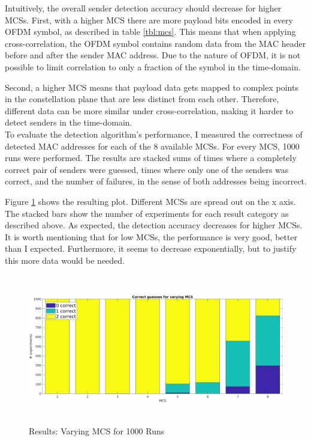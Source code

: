 Intuitively, the overall sender detection accuracy should decrease for higher \glspl{MCS}. First, with a higher \gls{MCS} there are more payload bits encoded in every \gls{OFDM} symbol, as described in table \ref{tbl:mcs}. This means that when applying cross-correlation, the \gls{OFDM} symbol contains random data from the \gls{MAC} header before and after the sender \gls{MAC} address. Due to the nature of \gls{OFDM}, it is not possible to limit correlation to only a fraction of the symbol in the time-domain.

Second, a higher \gls{MCS} means that payload data gets mapped to complex points in the constellation plane that are less distinct from each other. Therefore, different data can be more similar under cross-correlation, making it harder to detect senders in the time-domain.\\

To evaluate the detection algorithm's performance, I measured the correctness of detected \gls{MAC} addresses for each of the 8 available \glspl{MCS}. For every \gls{MCS}, 1000 runs were performed. The results are stacked sums of times where a completely correct pair of senders were guessed, times where only one of the senders was correct, and the number of failures, in the sense of both addresses being incorrect.

Figure \ref{fig:vary_mcs} shows the resulting plot. Different \glspl{MCS} are spread out on the x axis. The stacked bars show the number of experiments for each result category as described above. As expected, the detection accuracy decreases for higher \glspl{MCS}. It is worth mentioning that for low \glspl{MCS}, the performance is very good, better than I expected. Furthermore, it seems to decrease exponentially, but to justify this more data would be needed.

\begin{figure}[H]
	\centering
	\includegraphics[height=6.5cm]{gfx/plots/mcs}
	\caption{Results: Varying MCS for 1000 Runs}
	\label{fig:vary_mcs}
\end{figure}


